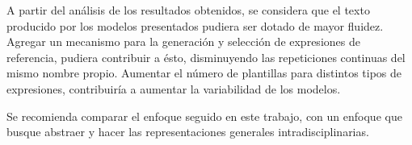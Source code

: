 \begin{recomendations}

   A partir del análisis de los resultados obtenidos, se considera que el texto producido por los 
modelos presentados pudiera ser dotado de mayor fluidez. Agregar un mecanismo 
para la generaci\'on y selección de expresiones de referencia, pudiera contribuir
a \'esto, disminuyendo las repeticiones continuas del mismo nombre propio. 
Aumentar el número de plantillas para distintos tipos de expresiones, 
contribuiría a aumentar la variabilidad de los modelos.

Se recomienda comparar el enfoque seguido en este trabajo, con un enfoque que busque abstraer  y hacer las representaciones generales
intradisciplinarias. 



\end{recomendations}
